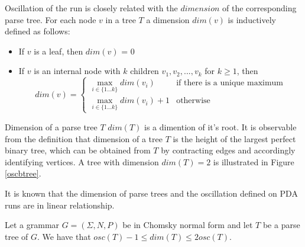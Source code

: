 Oscillation of the run is closely related with the $dimension$ of the corresponding parse tree. For each node $v$ in a tree $T$ a dimension $dim(v)$ is inductively defined as follows:
\begin{itemize}
\item If $v$ is a leaf, then $dim(v)$ = 0
\item If $v$ is an internal node with $k$ children $v_1, v_2, ..., v_k$ for $k \ge 1$, then 
\begin{equation}
dim(v) = 
 \begin{cases}
   \max_{i \in \{1...k\}}dim(v_i) &\text{if there is a unique maximum}\\
   \max_{i \in \{1...k\}}dim(v_i)+1 &\text{otherwise}
 \end{cases}
\end{equation}
\end{itemize}


Dimension of a parse tree $T$ $dim(T)$ is a dimention of it's root.  It is observable from the definition that dimension of a tree $T$ is the height of the largest perfect binary tree, which can be obtained from $T$ by contracting edges and accordingly identifying vertices. A tree with dimension $dim(T) = 2$ is illustrated in Figure \ref{oscbtree}.


It is known that the dimension of parse trees and the oscillation defined on PDA runs are in linear relationship.

\begin{lemma}
Let a grammar $G = (\Sigma, N, P)$ be in Chomsky normal form and let $T$ be a parse tree of $G$. We have that $osc(T) - 1 \le dim(T) \le 2osc(T)$.
\end{lemma}


